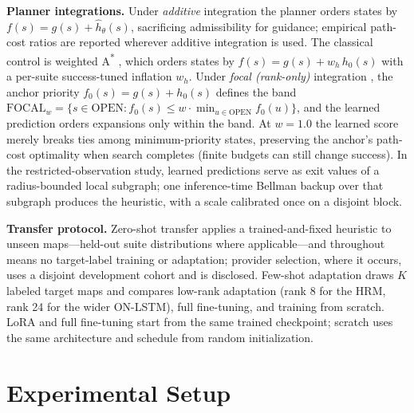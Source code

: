 \documentclass[letterpaper]{article} %
\begin{document}
\textbf{Planner integrations.} Under \emph{additive} integration the planner orders states by $f(s) = g(s) + \hat h_\theta(s)$, sacrificing admissibility for guidance; empirical path-cost ratios are reported wherever additive integration is used. The classical control is weighted A\textsuperscript{*} \citep{pohl1970}, which orders states by $f(s) = g(s) + w_h\, h_0(s)$ with a per-suite success-tuned inflation $w_h$. Under \emph{focal (rank-only)} integration \citep{pohl1970,pearl1982semiadmissible}, the anchor priority $f_0(s) = g(s) + h_0(s)$ defines the band $\mathrm{FOCAL}_w = \{ s \in \mathrm{OPEN} : f_0(s) \leq w \cdot \min_{u \in \mathrm{OPEN}} f_0(u) \}$, and the learned prediction orders expansions only within the band. At $w{=}1.0$ the learned score merely breaks ties among minimum-priority states, preserving the anchor's path-cost optimality when search completes (finite budgets can still change success). In the restricted-observation study, learned predictions serve as exit values of a radius-bounded local subgraph; one inference-time Bellman backup over that subgraph produces the heuristic, with a scale calibrated once on a disjoint block.

\textbf{Transfer protocol.} Zero-shot transfer applies a trained-and-fixed heuristic to unseen maps---held-out suite distributions where applicable---and throughout means no target-label training or adaptation; provider selection, where it occurs, uses a disjoint development cohort and is disclosed. Few-shot adaptation draws $K$ labeled target maps and compares low-rank adaptation \citep[LoRA;][]{hu2021lora} (rank 8 for the HRM, rank 24 for the wider ON-LSTM), full fine-tuning, and training from scratch. LoRA and full fine-tuning start from the same trained checkpoint; scratch uses the same architecture and schedule from random initialization.

\section{Experimental Setup}
\end{document}
